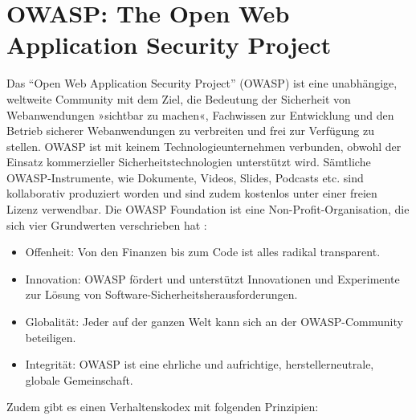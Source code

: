 \documentclass[12pt,oneside,a4paper,parskip]{scrbook}
\begin{document}
  \section{OWASP: The Open Web Application Security Project}
  Das ``Open Web Application Security Project'' (OWASP) ist eine unabhängige, weltweite Community mit dem Ziel, die Bedeutung der Sicherheit von Webanwendungen »sichtbar zu machen«, Fachwissen zur Entwicklung und den Betrieb sicherer Webanwendungen zu verbreiten und frei zur Verfügung zu stellen.
  OWASP ist mit keinem Technologieunternehmen verbunden, obwohl der Einsatz kommerzieller Sicherheitstechnologien unterstützt wird. Sämtliche OWASP-Instrumente, wie Dokumente, Videos, Slides, Podcasts etc. sind kollaborativ produziert worden und sind zudem kostenlos unter einer freien Lizenz verwendbar. Die OWASP Foundation ist eine Non-Profit-Organisation, die sich vier Grundwerten verschrieben hat \cite{OWASPabout}:
  \begin{itemize}
    \item Offenheit: Von den Finanzen bis zum Code ist alles radikal transparent.
    \item Innovation: OWASP fördert und unterstützt Innovationen und Experimente zur Lösung von Software-Sicherheitsherausforderungen.
    \item Globalität: Jeder auf der ganzen Welt kann sich an der OWASP-Community beteiligen.
    \item Integrität: OWASP ist eine ehrliche und aufrichtige, herstellerneutrale, globale Gemeinschaft.
  \end{itemize}
  Zudem gibt es einen Verhaltenskodex mit folgenden Prinzipien:
\end{document}
